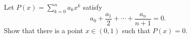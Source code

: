 \begin{exercise}
  \label{ex:hw07:polynomial-rolle}
  Let $P(x)=\sum_{k=0}^n a_kx^k$ satisfy
  \[
    a_0+\frac{a_1}{2}+\cdots+\frac{a_n}{n+1}=0.
  \]
  Show that there is a point $x\in(0,1)$ such that $P(x)=0$.
\end{exercise}
